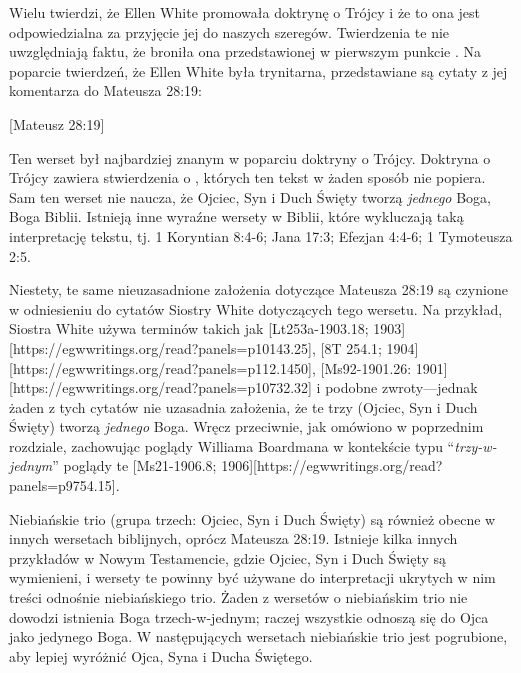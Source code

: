 
Wielu twierdzi, że Ellen White promowała doktrynę o Trójcy i że to ona jest odpowiedzialna za przyjęcie jej do naszych szeregów. Twierdzenia te nie uwzględniają faktu, że broniła ona  przedstawionej w pierwszym punkcie . Na poparcie twierdzeń, że Ellen White była trynitarna, przedstawiane są cytaty z jej komentarza do Mateusza 28:19:

[Mateusz 28:19]

Ten werset był najbardziej znanym w poparciu doktryny o Trójcy. Doktryna o Trójcy zawiera stwierdzenia o , których ten tekst w żaden sposób nie popiera. Sam ten werset nie naucza, że Ojciec, Syn i Duch Święty tworzą \textit{jednego} Boga, Boga Biblii. Istnieją inne wyraźne wersety w Biblii, które wykluczają taką interpretację tekstu, tj. 1 Koryntian 8:4-6; Jana 17:3; Efezjan 4:4-6; 1 Tymoteusza 2:5.

Niestety, te same nieuzasadnione założenia dotyczące Mateusza 28:19 są czynione w odniesieniu do cytatów Siostry White dotyczących tego wersetu. Na przykład, Siostra White używa terminów takich jak [Lt253a-1903.18; 1903][https://egwwritings.org/read?panels=p10143.25], [8T 254.1; 1904][https://egwwritings.org/read?panels=p112.1450], [Ms92-1901.26: 1901][https://egwwritings.org/read?panels=p10732.32] i podobne zwroty—jednak żaden z tych cytatów nie uzasadnia założenia, że te trzy (Ojciec, Syn i Duch Święty) tworzą \textit{jednego} Boga. Wręcz przeciwnie, jak omówiono w poprzednim rozdziale, zachowując poglądy Williama Boardmana   w kontekście typu “\textit{trzy-w-jednym}” poglądy te  [Ms21-1906.8; 1906][https://egwwritings.org/read?panels=p9754.15].

Niebiańskie trio (grupa trzech: Ojciec, Syn i Duch Święty) są również obecne w innych wersetach biblijnych, oprócz Mateusza 28:19. Istnieje kilka innych przykładów w Nowym Testamencie, gdzie Ojciec, Syn i Duch Święty są wymienieni, i  wersety te powinny być używane do interpretacji ukrytych w nim treści odnośnie niebiańskiego trio. Żaden z wersetów o niebiańskim trio nie dowodzi istnienia Boga trzech-w-jednym; raczej wszystkie odnoszą się do Ojca jako jedynego Boga. W następujących wersetach niebiańskie trio jest pogrubione, aby lepiej wyróżnić Ojca, Syna i Ducha Świętego.

